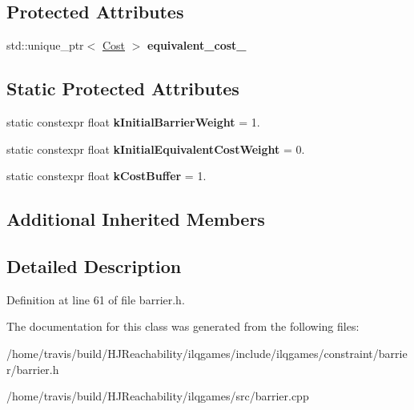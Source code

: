 \subsection*{Protected Attributes}
\begin{DoxyCompactItemize}
\item 
std\+::unique\+\_\+ptr$<$ \hyperlink{classilqgames_1_1_cost}{Cost} $>$ {\bfseries equivalent\+\_\+cost\+\_\+}\hypertarget{classilqgames_1_1_barrier_adeed72018db31920985d354b68664c85}{}\label{classilqgames_1_1_barrier_adeed72018db31920985d354b68664c85}

\end{DoxyCompactItemize}
\subsection*{Static Protected Attributes}
\begin{DoxyCompactItemize}
\item 
static constexpr float {\bfseries k\+Initial\+Barrier\+Weight} = 1.\hypertarget{classilqgames_1_1_barrier_a6b9c142464fd5d0d16ff690b9016f150}{}\label{classilqgames_1_1_barrier_a6b9c142464fd5d0d16ff690b9016f150}

\item 
static constexpr float {\bfseries k\+Initial\+Equivalent\+Cost\+Weight} = 0.\hypertarget{classilqgames_1_1_barrier_a9873ef0cc1e1182379bfefedfcf3d071}{}\label{classilqgames_1_1_barrier_a9873ef0cc1e1182379bfefedfcf3d071}

\item 
static constexpr float {\bfseries k\+Cost\+Buffer} = 1.\hypertarget{classilqgames_1_1_barrier_a91650f04f988f4619deb123e5fa55b69}{}\label{classilqgames_1_1_barrier_a91650f04f988f4619deb123e5fa55b69}

\end{DoxyCompactItemize}
\subsection*{Additional Inherited Members}


\subsection{Detailed Description}


Definition at line 61 of file barrier.\+h.



The documentation for this class was generated from the following files\+:\begin{DoxyCompactItemize}
\item 
/home/travis/build/\+H\+J\+Reachability/ilqgames/include/ilqgames/constraint/barrier/barrier.\+h\item 
/home/travis/build/\+H\+J\+Reachability/ilqgames/src/barrier.\+cpp\end{DoxyCompactItemize}
